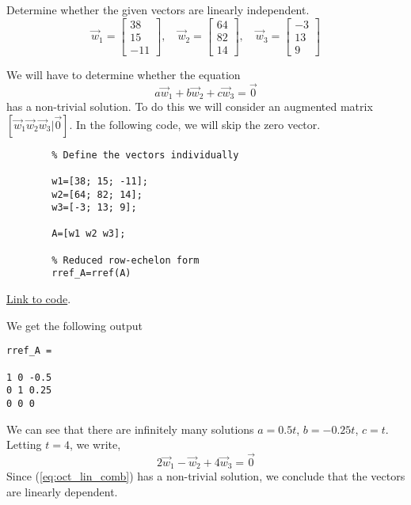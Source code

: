 \documentclass{ximera}
\begin{document}
\begin{example}\label{ex_oct_lin_ind}
    Determine whether the given vectors are linearly independent.  
    $$\vec{w}_1=\begin{bmatrix}38\\15\\-11\end{bmatrix},\quad \vec{w}_2=\begin{bmatrix}64\\82\\14\end{bmatrix},\quad \vec{w}_3=\begin{bmatrix}-3\\13\\9\end{bmatrix}$$

    \begin{explanation}
        We will have to determine whether the equation
        \begin{equation}\label{eq:oct_lin_comb}
            a\vec{w}_1+b\vec{w}_2+c\vec{w}_3=\vec{0}\end{equation}
        has a non-trivial solution.  To do this we will consider an augmented matrix $[\vec{w}_1 \vec{w}_2 \vec{w}_3 | \vec{0}]$.  In the following code, we will skip the zero vector.

        \begin{verbatim}
        % Define the vectors individually

        w1=[38; 15; -11];
        w2=[64; 82; 14];
        w3=[-3; 13; 9];

        A=[w1 w2 w3];

        % Reduced row-echelon form
        rref_A=rref(A)
        \end{verbatim}

        \href{https://sagecell.sagemath.org/?z=eJwlyMEKAiEUheG94DvczUAtXKhTTIgLoSdoKxGhV0YwBZsZ6e1zanH4Od8AVwwxIywzwoZuKfUNMfu4Rb8-U_pQQknj2spJAT8pYJzfVSeh7XlUMInO40-ktkz213fZgRKjbePQBDT5B0oGuKFfHXqopTF0M6aSIZT6oqRWDA-j9xzM8QvYDCpA&lang=octave&interacts=eJyLjgUAARUAuQ==}{Link to code}.
   
    We get the following output

    \begin{verbatim}
rref_A =

1 0 -0.5
0 1 0.25
0 0 0
    \end{verbatim}
We can see that there are infinitely many solutions $a=0.5t$, $b=-0.25t$, $c=t$.  Letting $t=4$, we write,
$$2\vec{w}_1-\vec{w}_2+4\vec{w}_3=\vec{0}$$
Since (\ref{eq:oct_lin_comb}) has a non-trivial solution, we conclude that the vectors are linearly dependent.
\end{explanation}
\end{example}
\end{document}
